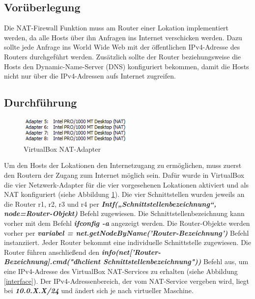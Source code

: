 \documentclass[fontsize=12pt,paper=a4,open=any,parskip=half,
  twoside=false,toc=listof,toc=bibliography,fleqn,leqno,
  captions=nooneline,captions=tableabove,british]{scrbook}
\begin{document}
\subsection{Vorüberlegung}
Die NAT-Firewall Funktion muss am Router einer Lokation implementiert werden, da alle Hosts über ihn Anfragen ins Internet verschicken werden. Dazu sollte jede Anfrage ins World Wide Web mit der öffentlichen IPv4-Adresse des Routers durchgeführt werden. Zusätzlich sollte der Router beziehungsweise die Hosts den Dynamic-Name-Server (DNS) konfiguriert bekommen, damit die Hosts nicht nur über die IPv4-Adressen aufs Internet zugreifen.

\subsection{Durchführung}
\begin{figure}
	\vspace{-\baselineskip}
 	\centering
 	\includegraphics[width=0.5\textwidth]{Bilder/adapter}
 	\captionsetup{justification=centering}
 	\caption{VirtualBox NAT-Adapter}
	\label{adapter}
\end{figure}

Um den Hosts der Lokationen den Internetzugang zu ermöglichen, muss zuerst den Routern der Zugang zum Internet möglich sein. Dafür wurde in VirtualBox die vier Netzwerk-Adapter für die vier vorgesehenen Lokationen aktiviert und als NAT konfiguriert (siehe Abbildung \ref{adapter}). 
Die vier Schnittstellen wurden jeweils an die Router r1, r2, r3 und r4 per \textit{\textbf{Intf(„Schnittstellenbezeichnung“, node=Router-Objekt)}} Befehl zugewiesen. Die Schnittstellenbezeichnung kann vorher mit dem Befehl \textit{\textbf{ifconfig -a}} angezeigt werden. Die Router-Objekte werden vorher per \textit{\textbf{variabel = net.getNodeByName('Router-Bezeichnung')}} Befehl instanziiert. Jeder Router bekommt eine individuelle Schnittstelle zugewiesen. Die Router führen anschließend den \textit{\textbf{info(net['Router-Bezeichnung].cmd("dhclient Schnittstellenbezeichnung"))}} Befehl aus, um eine IPv4-Adresse des VirtualBox NAT-Services zu erhalten (siehe Abbildung \ref{interface}). Der IPv4-Adressenbereich, der vom NAT-Service vergeben wird, liegt bei \textit{\textbf{10.0.X.X/24}} und ändert sich je nach virtueller Maschine.
\end{document}
